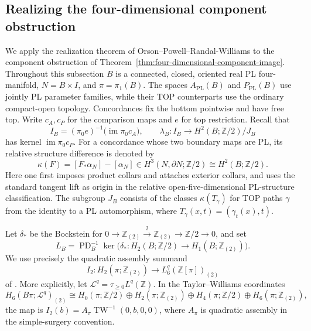 \subsection{Realizing the four-dimensional component obstruction}

We apply the realization theorem of Orson--Powell--Randal-Williams
to the component obstruction of
Theorem~\ref{thm:four-dimensional-component-image}.
Throughout this subsection $B$ is a connected, closed, oriented real
PL four-manifold, $N=B\times I$, and $\pi=\pi_1(B)$.
The spaces $A_{\mathrm{PL}}(B)$ and $P_{\mathrm{PL}}(B)$ use jointly
PL parameter families, while their TOP counterparts use the ordinary
compact-open topology. Concordances fix the bottom pointwise and have
free top. Write $c_A,c_P$ for the comparison maps and $e$ for top
restriction. Recall that
\[
 I_B=(\pi_0e)^{-1}\bigl(\operatorname{im}\pi_0c_A\bigr),
 \qquad
 \lambda_B:I_B\longrightarrow H^2(B;\mathbb Z/2)/J_B
\]
has kernel $\operatorname{im}\pi_0c_P$.
For a concordance whose two boundary maps are PL, its relative
structure difference is denoted by
\[
 \kappa(F)=[F_*\alpha_N]-[\alpha_N]
       \in H^3(N,\partial N;\mathbb Z/2)
       \cong H^2(B;\mathbb Z/2).
\]
Here one first imposes product collars and attaches exterior collars,
and uses the standard tangent lift as origin in the relative
open-five-dimensional PL-structure classification. The subgroup
$J_B$ consists of the classes $\kappa(T_\gamma)$ for TOP paths
$\gamma$ from the identity to a PL automorphism, where
$T_\gamma(x,t)=(\gamma_t(x),t)$.

Let $\delta_*$ be the Bockstein for
$0\to\mathbb Z_{(2)}\xrightarrow{2}\mathbb Z_{(2)}
\to\mathbb Z/2\to0$, and set
\begin{equation}\label{eq:four-dimensional-bockstein-subspace}
 L_B=\operatorname{PD}_B^{-1}
       \ker\bigl(\delta_*:H_2(B;\mathbb Z/2)
                      \longrightarrow H_1(B;\mathbb Z_{(2)})\bigr).
\end{equation}
We use precisely the quadratic assembly summand
\begin{equation}\label{eq:four-dimensional-assembly-summand}
 I_2:H_2(\pi;\mathbb Z_{(2)})
          \longrightarrow L^q_6(\mathbb Z[\pi])_{(2)}
\end{equation}
of \cite[Definition~5.8, p.~21]{OrsonPowellRandalWilliams2026}.
More explicitly, let $\mathcal L^q=\tau_{\geq0}L^q(\mathbb Z)$.
In the Taylor--Williams coordinates
\[
 H_6(B\pi;\mathcal L^q)_{(2)}\cong
 H_0(\pi;\mathbb Z/2)\oplus H_2(\pi;\mathbb Z_{(2)})
 \oplus H_4(\pi;\mathbb Z/2)\oplus H_6(\pi;\mathbb Z_{(2)}),
\]
the map is $I_2(b)=A_\pi\operatorname{TW}^{-1}(0,b,0,0)$,
where $A_\pi$ is quadratic assembly in the simple-surgery convention.

